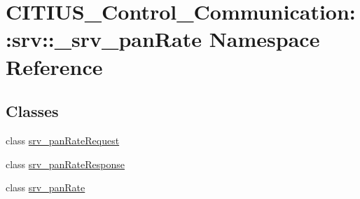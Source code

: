 \hypertarget{namespace_c_i_t_i_u_s___control___communication_1_1srv_1_1__srv__pan_rate}{\section{\-C\-I\-T\-I\-U\-S\-\_\-\-Control\-\_\-\-Communication\-:\-:srv\-:\-:\-\_\-srv\-\_\-pan\-Rate \-Namespace \-Reference}
\label{namespace_c_i_t_i_u_s___control___communication_1_1srv_1_1__srv__pan_rate}
}
\subsection*{\-Classes}
\begin{DoxyCompactItemize}
\item 
class \hyperlink{class_c_i_t_i_u_s___control___communication_1_1srv_1_1__srv__pan_rate_1_1srv__pan_rate_request}{srv\-\_\-pan\-Rate\-Request}
\item 
class \hyperlink{class_c_i_t_i_u_s___control___communication_1_1srv_1_1__srv__pan_rate_1_1srv__pan_rate_response}{srv\-\_\-pan\-Rate\-Response}
\item 
class \hyperlink{class_c_i_t_i_u_s___control___communication_1_1srv_1_1__srv__pan_rate_1_1srv__pan_rate}{srv\-\_\-pan\-Rate}
\end{DoxyCompactItemize}

